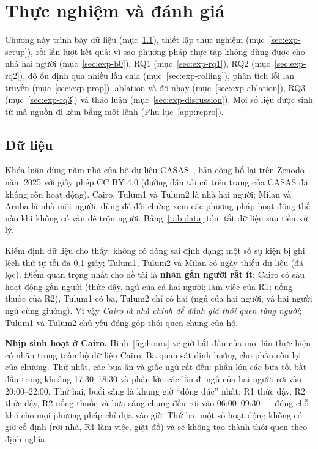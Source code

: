 \chapter{Thực nghiệm và đánh giá}
\label{chap:exp}

Chương này trình bày dữ liệu (mục~\ref{sec:exp-data}), thiết lập thực nghiệm (mục~\ref{sec:exp-setup}),
rồi lần lượt kết quả: vì sao phương pháp thực tập không dùng được cho nhà hai người
(mục~\ref{sec:exp-b0}), RQ1 (mục~\ref{sec:exp-rq1}), RQ2 (mục~\ref{sec:exp-rq2}), độ ổn định qua nhiều
lần chia (mục~\ref{sec:exp-rolling}), phân tích lỗi lan truyền (mục~\ref{sec:exp-prop}), ablation và độ nhạy (mục~\ref{sec:exp-ablation}), RQ3
(mục~\ref{sec:exp-rq3}) và thảo luận (mục~\ref{sec:exp-discussion}). Mọi số liệu được sinh từ mã nguồn
đi kèm bằng một lệnh (Phụ lục~\ref{app:repro}).

\section{Dữ liệu}
\label{sec:exp-data}

Khóa luận dùng năm nhà của bộ dữ liệu CASAS~\cite{casas2025zenodo,cook2013casas}, bản công bố lại trên
Zenodo năm 2025 với giấy phép CC BY 4.0 (đường dẫn tải cũ trên trang của CASAS đã không còn hoạt
động). Cairo, Tulum1 và Tulum2 là nhà hai người; Milan và Aruba là nhà một người, dùng để đối chứng
xem các phương pháp hoạt động thế nào khi không có vấn đề trộn người. Bảng~\ref{tab:data} tóm tắt dữ
liệu sau tiền xử lý.



Kiểm định dữ liệu cho thấy: không có dòng sai định dạng; một số sự kiện bị ghi lệch thứ tự tối đa
0,1 giây; Tulum1, Tulum2 và Milan có ngày thiếu dữ liệu (đã lọc). Điểm quan trọng nhất cho đề tài là
\textbf{nhãn gắn người rất ít}: Cairo có sáu hoạt động gắn người (thức dậy, ngủ của cả hai người; làm
việc của R1; uống thuốc của R2), Tulum1 có ba, Tulum2 chỉ có hai (ngủ của hai người, và hai người ngủ
cùng giường). Vì vậy \emph{Cairo là nhà chính để đánh giá thói quen từng người}; Tulum1 và Tulum2 chủ
yếu đóng góp thói quen chung của hộ.

\textbf{Nhịp sinh hoạt ở Cairo.} Hình~\ref{fig:hours} vẽ giờ bắt đầu của mọi lần thực hiện có nhãn trong
toàn bộ dữ liệu Cairo. Ba quan sát định hướng cho phần còn lại của chương. Thứ nhất, các bữa ăn và giấc ngủ
rất đều: phần lớn các bữa tối bắt đầu trong khoảng 17:30--18:30 và phần lớn các lần đi ngủ của hai người
rơi vào 20:00--22:00. Thứ hai,
buổi sáng là khung giờ ``đông đúc'' nhất: R1 thức dậy, R2 thức dậy, R2 uống thuốc và bữa sáng chung đều rơi
vào 06:00--09:30 --- đúng chỗ khó cho mọi phương pháp chỉ dựa vào giờ. Thứ ba, một số hoạt động không có giờ
cố định (rời nhà, R1 làm việc, giặt đồ) và sẽ không tạo thành thói quen theo định nghĩa.

